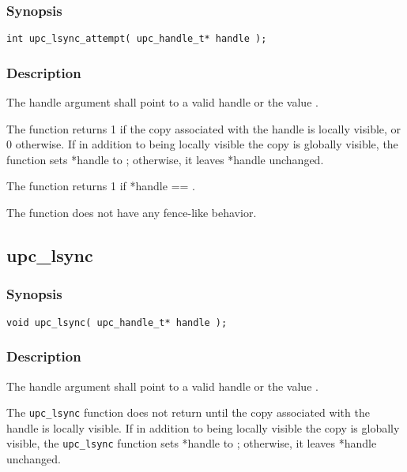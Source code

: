 \subsubsection{Synopsis}

\begin{verbatim}
int upc_lsync_attempt( upc_handle_t* handle ); 
\end{verbatim}

\subsubsection{Description}

\npf The handle argument shall point to a valid handle or the value
\complete{}.

\np The \function{} function returns 1 if the copy associated with the
handle is locally visible, or 0 otherwise.  If in addition to being locally
visible the copy is globally visible, the \function{} function sets *handle to
\complete{}; otherwise, it leaves *handle unchanged.

\np The \function{} function returns 1 if *handle == \complete{}.

\np The \function{} function does not have any fence-like behavior.

\subsection{upc\_lsync}
\def\function{{\tt upc\_lsync}}

\subsubsection{Synopsis}

\begin{verbatim}
void upc_lsync( upc_handle_t* handle );
\end{verbatim}

\subsubsection{Description}

\npf The handle argument shall point to a valid handle or the value
\complete{}.

\np The \function{} function does not return until the copy associated with
the handle is locally visible.  If in addition to being locally visible
the copy is globally visible, the \function{} function sets *handle to
\complete{}; otherwise, it leaves *handle unchanged.

